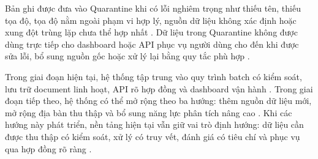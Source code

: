 Bản ghi được đưa vào Quarantine khi có lỗi nghiêm trọng như thiếu tên, thiếu tọa độ, tọa độ nằm ngoài phạm vi hợp lý, nguồn dữ liệu không xác định hoặc xung đột trùng lặp chưa thể hợp nhất \cite{ibmDataQuality}. Dữ liệu trong Quarantine không được dùng trực tiếp cho dashboard hoặc API phục vụ người dùng cho đến khi được sửa lỗi, bổ sung nguồn gốc hoặc xử lý lại bằng quy tắc phù hợp \cite{openapiSpec}.\par

Trong giai đoạn hiện tại, hệ thống tập trung vào quy trình batch có kiểm soát, lưu trữ document linh hoạt, API rõ hợp đồng và dashboard vận hành \cite{ibmETL}. Trong giai đoạn tiếp theo, hệ thống có thể mở rộng theo ba hướng: thêm nguồn dữ liệu mới, mở rộng địa bàn thu thập và bổ sung năng lực phân tích nâng cao \cite{zhang2023}. Khi các hướng này phát triển, nền tảng hiện tại vẫn giữ vai trò định hướng: dữ liệu cần được thu thập có kiểm soát, xử lý có truy vết, đánh giá có tiêu chí và phục vụ qua hợp đồng rõ ràng \cite{openapiSpec}.\par
